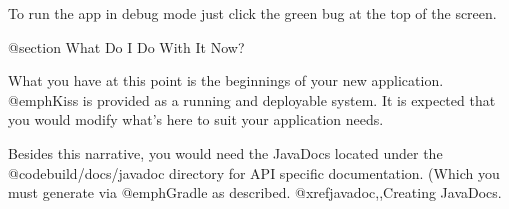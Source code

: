 To run the app in debug mode just click the green bug at the top of the screen.


@section What Do I Do With It Now?

What you have at this point is the beginnings of your new application.
@emph{Kiss} is provided as a running and deployable system.  It is
expected that you would modify what's here to suit your application
needs.

Besides this narrative, you would need the JavaDocs located under the
@code{build/docs/javadoc} directory for API specific documentation.
(Which you must generate via @emph{Gradle} as described. @xref{javadoc,,Creating JavaDocs}.
